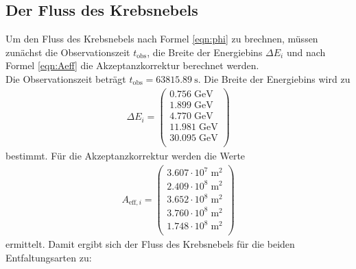 \subsection{Der Fluss des Krebsnebels}
Um den Fluss des Krebsnebels nach Formel \eqref{eqn:phi} zu brechnen, müssen zunächst die Observationszeit $t_{\text{obs}}$, die Breite der Energiebins $\Delta E_{i}$ und nach Formel \eqref{eqn:Aeff} die Akzeptanzkorrektur berechnet werden.\\
Die Observationszeit beträgt $t_{\text{obs}} = \SI{63815.89}{\second}$. Die Breite der Energiebins wird zu
\begin{align*}
	\Delta E_{i} = \begin{pmatrix}
			0.756\;\mathrm{GeV}\\
			1.899\;\mathrm{GeV}\\
			4.770\;\mathrm{GeV}\\
			11.981\;\mathrm{GeV}\\
			30.095\;\mathrm{GeV}\\
	\end{pmatrix}
\end{align*}
bestimmt.
Für die Akzeptanzkorrektur werden die Werte
\begin{align*}
	A_{\text{eff},i} = \begin{pmatrix}
			3.607\cdot10^{7}\;\mathrm{m}^2\\
			2.409\cdot10^{8}\;\mathrm{m}^2\\
			3.652\cdot10^{8}\;\mathrm{m}^2\\
			3.760\cdot10^{8}\;\mathrm{m}^2\\
			1.748\cdot10^{8}\;\mathrm{m}^2\\
	\end{pmatrix}
\end{align*}
ermittelt.
Damit ergibt sich der Fluss des Krebsnebels für die beiden Entfaltungsarten zu:

